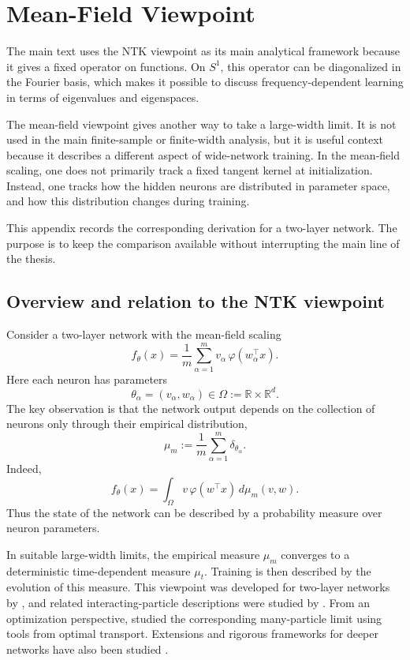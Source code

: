 \chapter{Mean-Field Viewpoint}
\label{cha:mean-field-appendix}

The main text uses the NTK viewpoint as its main analytical framework because
it gives a fixed operator on functions. On \(S^1\), this operator can be
diagonalized in the Fourier basis, which makes it possible to discuss
frequency-dependent learning in terms of eigenvalues and eigenspaces.

The mean-field viewpoint gives another way to take a large-width limit. It is
not used in the main finite-sample or finite-width analysis, but it is useful
context because it describes a different aspect of wide-network training. In
the mean-field scaling, one does not primarily track a fixed tangent kernel at
initialization. Instead, one tracks how the hidden neurons are distributed in
parameter space, and how this distribution changes during training.

This appendix records the corresponding derivation for a two-layer network. The
purpose is to keep the comparison available without interrupting the main line
of the thesis.

\section{Overview and relation to the NTK viewpoint}\label{app:mf-overview}

Consider a two-layer network with the mean-field scaling
\begin{equation}
	f_\theta(x)
	=
	\frac{1}{m}
	\sum_{\alpha=1}^m
	v_\alpha\,\varphi(w_\alpha^\top x).
	\label{eq:app-mf-network-overview}
\end{equation}
Here each neuron has parameters
\[
	\theta_\alpha=(v_\alpha,w_\alpha)
	\in
	\Omega:=\mathbb R\times\mathbb R^d .
\]
The key observation is that the network output depends on the collection of
neurons only through their empirical distribution,
\[
	\mu_m
	:=
	\frac{1}{m}
	\sum_{\alpha=1}^m \delta_{\theta_\alpha}.
\]
Indeed,
\[
	f_\theta(x)
	=
	\int_\Omega v\,\varphi(w^\top x)\,d\mu_m(v,w).
\]
Thus the state of the network can be described by a probability measure over
neuron parameters.

In suitable large-width limits, the empirical measure \(\mu_m\) converges to a
deterministic time-dependent measure \(\mu_t\). Training is then described by
the evolution of this measure. This viewpoint was developed for two-layer
networks by \citet{Mei2018meanfieldview}, and related interacting-particle
descriptions were studied by \citet{Rotskoff_2022}. From an optimization
perspective, \citet{chizat2018globalconvergencegradientdescent} studied the
corresponding many-particle limit using tools from optimal transport.
Extensions and rigorous frameworks for deeper networks have also been studied
\citep{nguyen2019meanfieldlimitlearning,araujo2019meanfieldlimitcertaindeep,
	sirignano2019meanfieldanalysisneural,nguyen2023rigorousframeworkmeanfield}.

